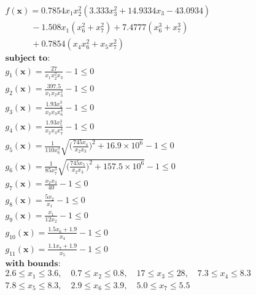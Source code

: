 \begin{equation*}
\begin{aligned}
& f(\bm{x}) = 0.7854x_1x_2^2(3.333x_3^2 + 14.9334x_3 - 43.0934) \\
& \quad \qquad - 1.508x_1(x_6^2 + x_7^2) + 7.4777(x_6^3 + x_7^3) \\
& \quad \qquad + 0.7854(x_4 x_6^2 + x_5x_7^2) \\[0.5em]
& \textbf{subject to:}\\
& g_1(\bm{x}) = \frac{27}{x_1x_2^2x_3} - 1 \leq 0 \\
& g_2(\bm{x}) = \frac{397.5}{x_1x_2x_3^2} - 1 \leq 0 \\
& g_3(\bm{x}) = \frac{1.93x_4^3}{x_2x_3x_6^4} -1 \leq 0 \\
& g_4(\bm{x}) = \frac{1.93x_5^3}{x_2x_3x_7^4} -1 \leq 0 \\
& g_5(\bm{x}) = \frac{1}{110x_6^3} \sqrt{\Big( \frac{745x_4}{x_2x_3} \Big)^2 + 16.9 \times 10^6} - 1 \leq 0 \\
& g_6(\bm{x}) = \frac{1}{85x_7^3} \sqrt{\Big( \frac{745x_5}{x_2x_3} \Big)^2 + 157.5 \times 10^6} - 1 \leq 0 \\
& g_7(\bm{x}) = \frac{x_2x_3}{40} - 1 \leq 0 \\
& g_8(\bm{x}) = \frac{5x_2}{x_1} - 1 \leq 0 \\
& g_9(\bm{x}) = \frac{x_1}{12x_2} - 1 \leq 0 \\
& g_{10}(\bm{x}) = \frac{1.5x_6 + 1.9}{x_4} - 1 \leq 0 \\
& g_{11}(\bm{x}) = \frac{1.1x_7 + 1.9}{x_5} - 1 \leq 0 \\[0.5em]
& \textbf{with bounds:} \\
& 2.6 \leq x_1 \leq 3.6, \quad 0.7 \leq x_2 \leq 0.8, \quad 17 \leq x_3 \leq 28, \quad 7.3 \leq x_4 \leq 8.3 \\
& 7.8 \leq x_5 \leq 8.3, \quad 2.9 \leq x_6 \leq 3.9, \quad 5.0 \leq x_7 \leq 5.5
\end{aligned}
\end{equation*}